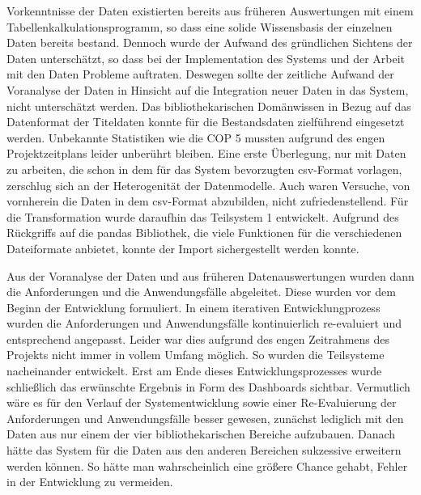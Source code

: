 Vorkenntnisse der Daten existierten bereits aus früheren Auswertungen mit einem Tabellenkalkulationsprogramm, so dass eine solide Wissensbasis 
der einzelnen Daten bereits bestand. Dennoch wurde der Aufwand des gründlichen Sichtens der Daten unterschätzt, so dass bei 
der Implementation des Systems und der Arbeit mit den Daten Probleme auftraten. Deswegen sollte der zeitliche Aufwand der Voranalyse der Daten in Hinsicht auf die Integration neuer
Daten in das System, nicht unterschätzt werden. Das bibliothekarischen Domänwissen in Bezug auf das Datenformat der Titeldaten konnte
für die Bestandsdaten zielführend eingesetzt werden. Unbekannte Statistiken wie die \acrlong{COP 5} mussten aufgrund des engen Projektzeitplans leider unberührt bleiben.
Eine erste Überlegung, nur mit Daten zu arbeiten, die schon in dem für das System bevorzugten csv-Format vorlagen, 
zerschlug sich an der Heterogenität der Datenmodelle. Auch waren Versuche, von vornherein die Daten in dem csv-Format abzubilden, nicht zufriedenstellend.
Für die Transformation wurde daraufhin das Teilsystem 1 entwickelt.
Aufgrund des Rückgriffs auf die pandas Bibliothek, die viele Funktionen für die verschiedenen Dateiformate anbietet, konnte der Import sichergestellt werden konnte.

Aus der Voranalyse der Daten und aus früheren Datenauswertungen wurden dann die Anforderungen und die Anwendungsfälle abgeleitet.
Diese wurden vor dem Beginn der Entwicklung formuliert. In einem iterativen Entwicklungprozess wurden die Anforderungen und Anwendungsfälle kontinuierlich re-evaluiert und 
entsprechend angepasst. Leider war dies aufgrund des engen Zeitrahmens des Projekts nicht immer in vollem Umfang möglich. So wurden die Teilsysteme nacheinander entwickelt. 
Erst am Ende dieses Entwicklungsprozesses wurde schließlich das erwünschte Ergebnis in Form des Dashboards sichtbar. Vermutlich wäre es für den Verlauf der Systementwicklung sowie einer
Re-Evaluierung der Anforderungen und Anwendungsfälle besser gewesen, zunächst lediglich mit den Daten aus nur einem der vier bibliothekarischen Bereiche
aufzubauen. Danach hätte das System für die Daten aus den anderen Bereichen sukzessive erweitern werden können. 
So hätte man wahrscheinlich eine größere Chance gehabt, Fehler in der Entwicklung zu vermeiden.



